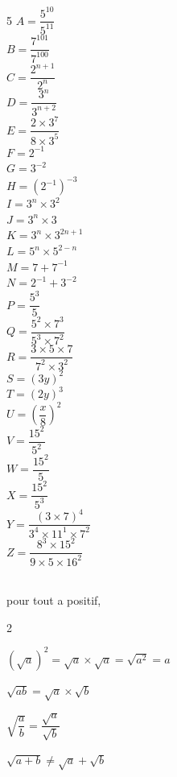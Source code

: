 \documentclass[10pt,a4paper]{article}  %
\begin{document}
\begin{multicols}{5}
	$A=\dfrac{5^{10}}{5^{11}}$\\
	$B=\dfrac{7^{101}}{7^{100}}$\\
	$C=\dfrac{2^{n+1}}{2^{n}}$\\
	$D=\dfrac{3^{n}}{3^{n+2}}$\\
	$E=\dfrac{2 \times 3^{7}}{8 \times 3^{5}}$\\
	$F=2^{-1}$\\
	$G=3^{-2}$\\
	$H=\left(2^{-1}\right)^{-3}$\\
	$I=3^{n} \times 3^{2}$\\
	$J=3^{n} \times 3$\\
	$K=3^{n} \times 3^{2 n+1}$\\
	$L=5^{n} \times 5^{2-n}$\\
	$M=7+7^{-1}$\\
	$N=2^{-1}+3^{-2}$\\
	$P=\dfrac{5^{3}}{5}$\\
	$Q=\dfrac{5^{2} \times 7^{3}}{5^{3} \times 7^{2}}$\\
	$R=\dfrac{3 \times 5 \times 7}{7^{2} \times 3^{2}}$\\
	$S=(3 y)^{2}$\\
	$T=(2 y)^{3}$\\
	$U=\left(\dfrac{x}{8}\right)^{2}$\\
	$V=\dfrac{15^{2}}{5^{2}}$\\
	$W=\dfrac{15^{2}}{5}$\\
	$X=\dfrac{15^{2}}{5^{3}}$\\
	$Y=\dfrac{(3 \times 7)^{4}}{3^{4} \times 11^{1} \times 7^{2}}$\\
	$Z=\dfrac{8^{3} \times 15^{2}}{9 \times 5 \times 16^{2}}$\\
\end{multicols}
\vspace*{-0.8cm}
\exerciceDS{}
\begin{brappel}
	\\
	pour tout a positif,
	\begin{multicols}{2}
		\begin{itemMet}
			\item $(\sqrt{a})^{2}=\sqrt{a} \times \sqrt{a}=\sqrt{a^{2}}=a$
			\item $\sqrt{a b}=\sqrt{a} \times \sqrt{b}$
			\item $\sqrt{\dfrac{a}{b}}=\dfrac{\sqrt{a}}{\sqrt{b}}$
			\item $\sqrt{a+b} \neq \sqrt{a}+\sqrt{b}$
		\end{itemMet}
	\end{multicols}
\end{brappel}
\end{document}
